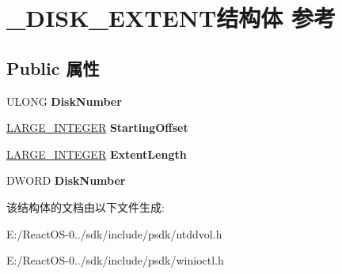 \hypertarget{struct___d_i_s_k___e_x_t_e_n_t}{}\section{\+\_\+\+D\+I\+S\+K\+\_\+\+E\+X\+T\+E\+N\+T结构体 参考}
\label{struct___d_i_s_k___e_x_t_e_n_t}
\subsection*{Public 属性}
\begin{DoxyCompactItemize}
\item 
\mbox{\label{struct___d_i_s_k___e_x_t_e_n_t_a2125e77d99b51345a8d3c4df22b611ad}} 
U\+L\+O\+NG {\bfseries Disk\+Number}
\item 
\mbox{\label{struct___d_i_s_k___e_x_t_e_n_t_a835a94c6d57c9e25e6315d6a76e13a28}} 
\hyperlink{union___l_a_r_g_e___i_n_t_e_g_e_r}{L\+A\+R\+G\+E\+\_\+\+I\+N\+T\+E\+G\+ER} {\bfseries Starting\+Offset}
\item 
\mbox{\label{struct___d_i_s_k___e_x_t_e_n_t_af3645bf81eb712a6b4f70afc50972744}} 
\hyperlink{union___l_a_r_g_e___i_n_t_e_g_e_r}{L\+A\+R\+G\+E\+\_\+\+I\+N\+T\+E\+G\+ER} {\bfseries Extent\+Length}
\item 
\mbox{\label{struct___d_i_s_k___e_x_t_e_n_t_a2125e77d99b51345a8d3c4df22b611ad}} 
D\+W\+O\+RD {\bfseries Disk\+Number}
\end{DoxyCompactItemize}


该结构体的文档由以下文件生成\+:\begin{DoxyCompactItemize}
\item 
E\+:/\+React\+O\+S-\/0../sdk/include/psdk/ntddvol.\+h\item 
E\+:/\+React\+O\+S-\/0../sdk/include/psdk/winioctl.\+h\end{DoxyCompactItemize}

